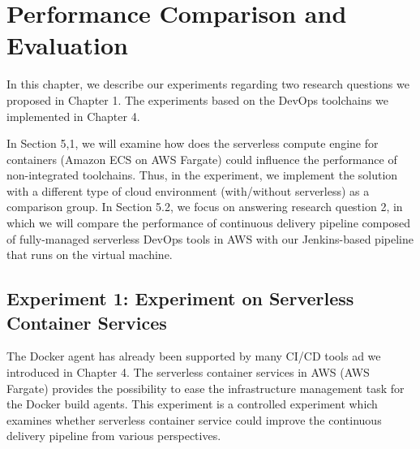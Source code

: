 \chapter{Performance Comparison and Evaluation}
In this chapter, we describe our experiments regarding two research questions we proposed in Chapter 1. The experiments based on the DevOps toolchains we implemented in Chapter 4.
\par
In Section 5,1, we will examine how does the serverless compute engine for containers (Amazon ECS on AWS Fargate) could influence the performance of non-integrated toolchains. Thus, in the experiment, we implement the solution with a different type of cloud environment (with/without serverless) as a comparison group.
In Section 5.2, we focus on answering research question 2, in which we will compare the performance of continuous delivery pipeline composed of fully-managed serverless DevOps tools in AWS with our Jenkins-based pipeline that runs on the virtual machine.
\section{Experiment 1: Experiment on Serverless Container Services}
The Docker agent has already been supported by many CI/CD tools ad we introduced in Chapter 4.
The serverless container services in AWS (AWS Fargate) provides the possibility to ease the infrastructure management task for the Docker build agents.
This experiment is a controlled experiment which examines whether serverless container service could improve the continuous delivery pipeline from various perspectives.
